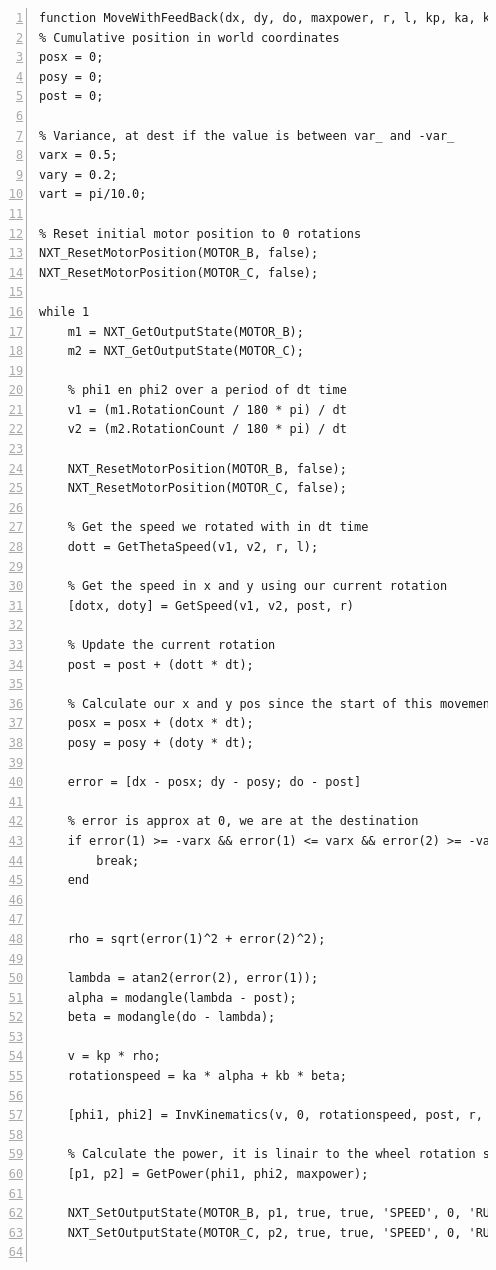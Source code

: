 \documentclass[a4paper]{article}
\begin{document}
\begin{lstlisting}[caption= Kinematica met feedback code, label=lst:bocht, numbers=left]
function MoveWithFeedBack(dx, dy, do, maxpower, r, l, kp, ka, kb, dt)
% Cumulative position in world coordinates
posx = 0;
posy = 0;
post = 0;

% Variance, at dest if the value is between var_ and -var_
varx = 0.5;
vary = 0.2;
vart = pi/10.0;

% Reset initial motor position to 0 rotations
NXT_ResetMotorPosition(MOTOR_B, false);
NXT_ResetMotorPosition(MOTOR_C, false);

while 1
    m1 = NXT_GetOutputState(MOTOR_B);
    m2 = NXT_GetOutputState(MOTOR_C);
    
    % phi1 en phi2 over a period of dt time
	v1 = (m1.RotationCount / 180 * pi) / dt
	v2 = (m2.RotationCount / 180 * pi) / dt
	
    NXT_ResetMotorPosition(MOTOR_B, false);
    NXT_ResetMotorPosition(MOTOR_C, false);
	
    % Get the speed we rotated with in dt time
	dott = GetThetaSpeed(v1, v2, r, l);
	
    % Get the speed in x and y using our current rotation
	[dotx, doty] = GetSpeed(v1, v2, post, r)
    
    % Update the current rotation
	post = post + (dott * dt);
	
    % Calculate our x and y pos since the start of this movement
	posx = posx + (dotx * dt);
	posy = posy + (doty * dt);

	error = [dx - posx; dy - posy; do - post]
    
    % error is approx at 0, we are at the destination
	if error(1) >= -varx && error(1) <= varx && error(2) >= -vary && error(2) <= vary && error(3) >= -vart && error(3) <= vart
		break;
	end
	
   
    rho = sqrt(error(1)^2 + error(2)^2);
	
    lambda = atan2(error(2), error(1));
	alpha = modangle(lambda - post);
	beta = modangle(do - lambda);
    
	v = kp * rho;
	rotationspeed = ka * alpha + kb * beta;
	
	[phi1, phi2] = InvKinematics(v, 0, rotationspeed, post, r, l);
	
    % Calculate the power, it is linair to the wheel rotation speed
	[p1, p2] = GetPower(phi1, phi2, maxpower);

	NXT_SetOutputState(MOTOR_B, p1, true, true, 'SPEED', 0, 'RUNNING',  0, 'dontreply');
	NXT_SetOutputState(MOTOR_C, p2, true, true, 'SPEED', 0, 'RUNNING',  0, 'dontreply');
	

\end{lstlisting}
\end{document}
